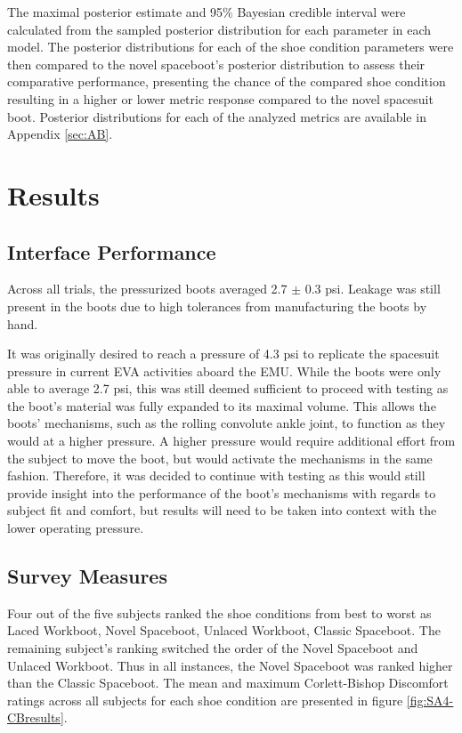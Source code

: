 \documentclass[defaultstyle,11pt]{thesis}
\begin{document}
The maximal posterior estimate and 95\% Bayesian credible interval were calculated from the sampled posterior distribution for each parameter in each model.
The posterior distributions for each of the shoe condition parameters were then compared to the novel spaceboot's posterior distribution to assess their comparative performance, presenting the chance of the compared shoe condition resulting in a higher or lower metric response compared to the novel spacesuit boot.
Posterior distributions for each of the analyzed metrics are available in Appendix \ref{sec:AB}.

\hypertarget{results-3}{%
\section{Results}\label{results-3}}

\hypertarget{interface-performance}{%
\subsection{Interface Performance}\label{interface-performance}}

Across all trials, the pressurized boots averaged 2.7 \(\pm\) 0.3 psi.
Leakage was still present in the boots due to high tolerances from manufacturing the boots by hand.

It was originally desired to reach a pressure of 4.3 psi to replicate the spacesuit pressure in current EVA activities aboard the EMU.
While the boots were only able to average 2.7 psi, this was still deemed sufficient to proceed with testing as the boot's material was fully expanded to its maximal volume.
This allows the boots' mechanisms, such as the rolling convolute ankle joint, to function as they would at a higher pressure.
A higher pressure would require additional effort from the subject to move the boot, but would activate the mechanisms in the same fashion.
Therefore, it was decided to continue with testing as this would still provide insight into the performance of the boot's mechanisms with regards to subject fit and comfort, but results will need to be taken into context with the lower operating pressure.

\hypertarget{survey-measures-1}{%
\subsection{Survey Measures}\label{survey-measures-1}}

Four out of the five subjects ranked the shoe conditions from best to worst as Laced Workboot, Novel Spaceboot, Unlaced Workboot, Classic Spaceboot.
The remaining subject's ranking switched the order of the Novel Spaceboot and Unlaced Workboot.
Thus in all instances, the Novel Spaceboot was ranked higher than the Classic Spaceboot.
The mean and maximum Corlett-Bishop Discomfort ratings across all subjects for each shoe condition are presented in figure \ref{fig:SA4-CBresults}.
\end{document}

